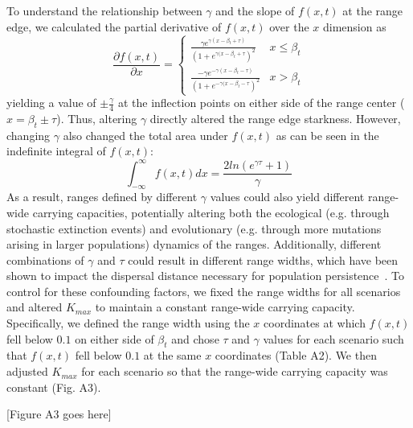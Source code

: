 \documentclass[11pt]{article}
\begin{document}
To understand the relationship between $\gamma$ and the slope of $f(x,t)$ at the range edge, we calculated the partial derivative of $f(x,t)$ over the $x$ dimension as
\begin{equation}
\frac{\partial f(x,t)}{\partial x}=
\begin{cases}
	\frac{\gamma e^{\gamma(x-\beta_{t}+\tau)}}{(1+e^{\gamma(x-\beta_{t}+\tau})^{2}} & x \leq \beta_{t} \\
	\frac{-\gamma e^{-\gamma(x-\beta_{t}-\tau)}}{(1+e^{-\gamma(x-\beta_{t}-\tau})^{2}} & x > \beta_{t}
\end{cases}	
\end{equation}
yielding a value of $\pm\frac{\gamma}{4}$ at the inflection points on either side of the range center ($x=\beta_{t}\pm\tau$). Thus, altering $\gamma$ directly altered the range edge starkness. However, changing $\gamma$ also changed the total area under $f(x,t)$ as can be seen in the indefinite integral of $f(x,t)$:
\begin{equation}
\int_{-\infty}^{\infty}f(x,t)dx = \frac{2ln(e^{\gamma\tau}+1)}{\gamma}
\end{equation}
As a result, ranges defined by different $\gamma$ values could also yield different range-wide carrying capacities, potentially altering both the ecological (e.g. through stochastic extinction events) and evolutionary (e.g. through more mutations arising in larger populations) dynamics of the ranges. Additionally, different combinations of $\gamma$ and $\tau$ could result in different range widths, which have been shown to impact the dispersal distance necessary for population persistence~\citep{van1997integrodifference}. To control for these confounding factors, we fixed the range widths for all scenarios and altered $K_{max}$ to maintain a constant range-wide carrying capacity. Specifically, we defined the range width using the $x$ coordinates at which $f(x,t)$ fell below $0.1$ on either side of $\beta_{t}$ and chose $\tau$ and $\gamma$ values for each scenario such that $f(x,t)$ fell below $0.1$ at the same $x$ coordinates (Table A2). We then adjusted $K_{max}$ for each scenario so that the range-wide carrying capacity was constant (Fig. A3).

[Figure A3 goes here]
\end{document}

